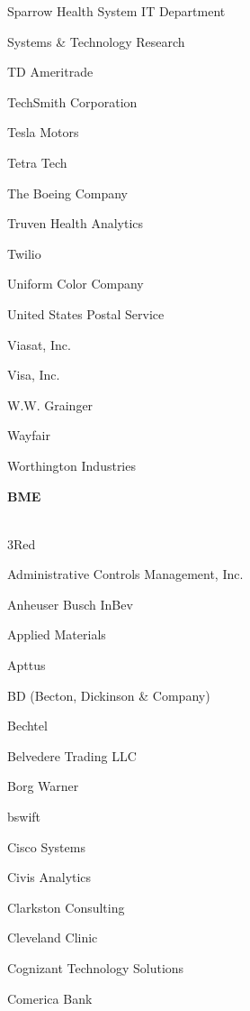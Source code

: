 \documentclass[twoside]{article}
\begin{document}
\begin{center}
\begin{multicols}{5}
\begin{FlushLeft}
\begin{compactitem}
\item Sparrow Health System IT Department
\item Systems \& Technology Research
\item TD Ameritrade
\item TechSmith Corporation
\item Tesla Motors
\item Tetra Tech
\item The Boeing Company
\item Truven Health Analytics
\item Twilio
\item Uniform Color Company
\item United States Postal Service
\item Viasat, Inc.
\item Visa, Inc.
\item W.W. Grainger
\item Wayfair
\item Worthington Industries
\end{compactitem}
        \end{FlushLeft}
        \vspace{1em}
        {\fontsize{14}{16}\selectfont \bf BME}\\
        \vspace{-1em}
        ~\hrulefill~
        \vspace{-.9em}
        \begin{FlushLeft}
        \begin{compactitem}
        \item 3Red
\item Administrative Controls Management, Inc.
\item Anheuser Busch InBev
\item Applied Materials
\item Apttus
\item BD (Becton, Dickinson \& Company)
\item Bechtel
\item Belvedere Trading LLC
\item Borg Warner
\item bswift
\item Cisco Systems
\item Civis Analytics
\item Clarkston Consulting
\item Cleveland Clinic
\item Cognizant Technology Solutions
\item Comerica Bank

\end{compactitem}
\end{FlushLeft}
\end{multicols}
\end{center}
\end{document}
